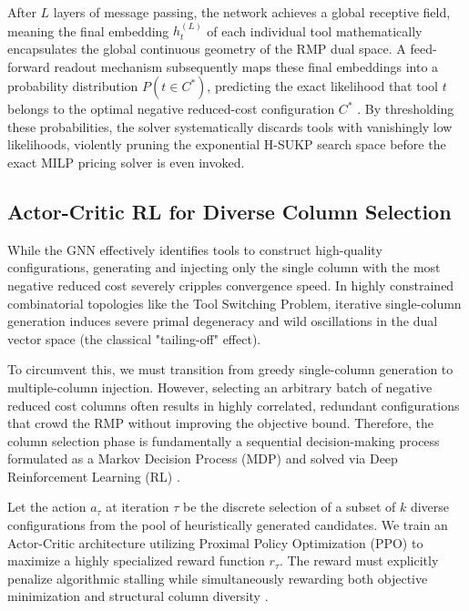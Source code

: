 \documentclass[11pt, a4paper]{book}
\begin{document}
	After $L$ layers of message passing, the network achieves a global receptive field, meaning the final embedding $h_t^{(L)}$ of each individual tool mathematically encapsulates the global continuous geometry of the RMP dual space. A feed-forward readout mechanism subsequently maps these final embeddings into a probability distribution $P(t \in C^*)$, predicting the exact likelihood that tool $t$ belongs to the optimal negative reduced-cost configuration $C^*$ %
	. By thresholding these probabilities, the solver systematically discards tools with vanishingly low likelihoods, violently pruning the exponential H-SUKP search space before the exact MILP pricing solver is even invoked.
	
	\subsection{Actor-Critic RL for Diverse Column Selection}
	
	While the GNN effectively identifies tools to construct high-quality configurations, generating and injecting only the single column with the most negative reduced cost severely cripples convergence speed. In highly constrained combinatorial topologies like the Tool Switching Problem, iterative single-column generation induces severe primal degeneracy and wild oscillations in the dual vector space (the classical "tailing-off" effect). 
	
	To circumvent this, we must transition from greedy single-column generation to multiple-column injection. However, selecting an arbitrary batch of negative reduced cost columns often results in highly correlated, redundant configurations that crowd the RMP without improving the objective bound. Therefore, the column selection phase is fundamentally a sequential decision-making process formulated as a Markov Decision Process (MDP) and solved via Deep Reinforcement Learning (RL) %
	.
	
	Let the action $a_\tau$ at iteration $\tau$ be the discrete selection of a subset of $k$ diverse configurations from the pool of heuristically generated candidates. We train an Actor-Critic architecture utilizing Proximal Policy Optimization (PPO) to maximize a highly specialized reward function $r_\tau$. The reward must explicitly penalize algorithmic stalling while simultaneously rewarding both objective minimization and structural column diversity %
	.
	
\end{document}
